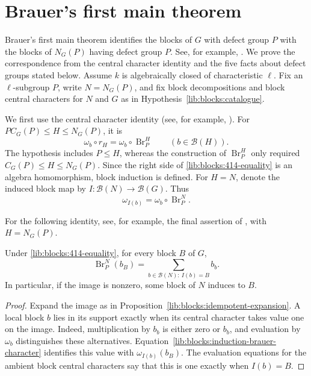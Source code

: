 \section{Brauer's first main theorem}
\label{lib:blocks:normaliser-correspondence}

Brauer's first main theorem identifies the blocks of $G$ with defect
group $P$ with the blocks of $N_G(P)$ having defect group $P$.
See, for example, \cite[Theorem~4.17]{Navarro1998}.
We prove the correspondence from the central character identity and the
five facts about defect groups stated below.
Assume $k$ is algebraically closed of
characteristic $\ell$. Fix an $\ell$-subgroup $P$, write
$N=N_G(P)$, and fix block decompositions and block central characters
for $N$ and $G$ as in Hypothesis~\ref{lib:blocks:catalogue}.

We first use the central character identity
(see, for example, \cite[Theorem~4.14]{Navarro1998}). For
$PC_G(P)\leq H\leq N_G(P)$, it is
\begin{equation}
 \omega_b\circ r_H=\omega_b\circ\operatorname{Br}_P^H
 \qquad(b\in\mathcal B(H)).
 \label{lib:blocks:414-equality}
\end{equation}
The hypothesis includes $P\leq H$, whereas the construction of
$\operatorname{Br}_P^H$ only required $C_G(P)\leq H\leq N_G(P)$.
Since the right side of \eqref{lib:blocks:414-equality} is an algebra
homomorphism, block induction is defined. For $H=N$, denote the induced
block map by
$I:\mathcal B(N)\to\mathcal B(G)$. Thus
\begin{equation}
 \omega_{I(b)}=\omega_b\circ\operatorname{Br}_P^N.
 \label{lib:blocks:induction-brauer-character}
\end{equation}

For the following identity, see, for example, the final assertion of
\cite[Theorem~4.14]{Navarro1998}, with $H=N_G(P)$.

\begin{proposition}
\label{lib:blocks:fibre}
Under \eqref{lib:blocks:414-equality}, for every block $B$ of $G$,
\[
 \operatorname{Br}_P^N(b_B)=\sum_{b\in\mathcal B(N):\ I(b)=B}b_b.
\]
In particular, if the image is nonzero, some block of $N$ induces to $B$.
\end{proposition}
\begin{proof}
Expand the image as in Proposition~\ref{lib:blocks:idempotent-expansion}.
A local block $b$ lies in its support exactly when its central
character takes value one on the image. Indeed, multiplication by $b_b$
is either zero or $b_b$, and evaluation by $\omega_b$ distinguishes
these alternatives. Equation~\eqref{lib:blocks:induction-brauer-character}
identifies this value with $\omega_{I(b)}(b_B)$. The evaluation equations
for the ambient block central characters say that this is one exactly
when $I(b)=B$.
\end{proof}

